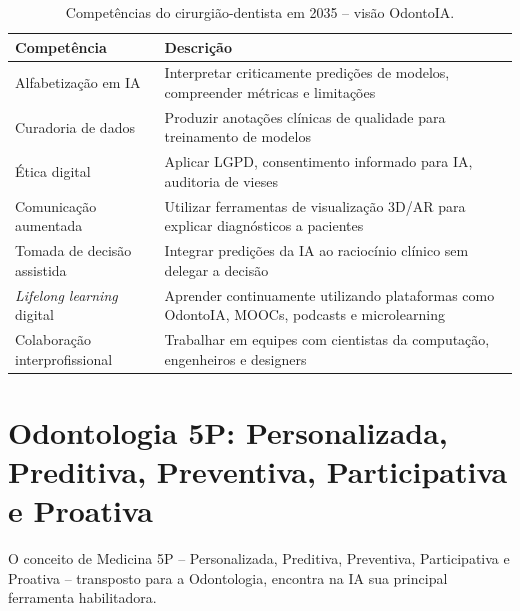 \begin{table}[H]
  \centering
  \caption{Competências do cirurgião-dentista em 2035 -- visão OdontoIA.}
  \label{tab:competencias-2035}
  \begin{tabularx}{\textwidth}{lX}
    \toprule
    \textbf{Competência} & \textbf{Descrição} \\
    \midrule
    Alfabetização em IA & Interpretar criticamente predições de modelos,
      compreender métricas e limitações \\
    Curadoria de dados & Produzir anotações clínicas de qualidade para
      treinamento de modelos \\
    Ética digital & Aplicar LGPD, consentimento informado para IA, auditoria
      de vieses \\
    Comunicação aumentada & Utilizar ferramentas de visualização 3D/AR para
      explicar diagnósticos a pacientes \\
    Tomada de decisão assistida & Integrar predições da IA ao raciocínio
      clínico sem delegar a decisão \\
    \textit{Lifelong learning} digital & Aprender continuamente utilizando
      plataformas como OdontoIA, MOOCs, podcasts e microlearning \\
    Colaboração interprofissional & Trabalhar em equipes com cientistas da
      computação, engenheiros e designers \\
    \bottomrule
  \end{tabularx}
\end{table}


\section{Odontologia 5P: Personalizada, Preditiva, Preventiva, Participativa e Proativa}
\label{sec:odontologia-5p}

\nivelquatro

O conceito de Medicina 5P -- Personalizada, Preditiva, Preventiva, Participativa
e Proativa -- transposto para a Odontologia, encontra na IA sua principal
ferramenta habilitadora.


